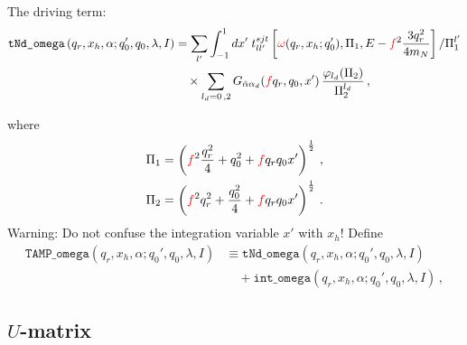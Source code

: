 \documentclass[11pt,aps]{revtex4}
\newcommand{\PF}{{\color{red}f}}
\newcommand{\orig}[1]{{\color{red} #1 }}
\newcommand{\cmplx}[1]{{\color{red} #1 }}
\begin{document}
The driving term:
\begin{equation}
\begin{split}
  \texttt{tNd\_omega}\left(q_r, x_h, \alpha; q_0', q_0, \lambda, I \right) &= \sum_{l'} \int_{-1}^1 dx'\; t_{ll'}^{sjt} \left[\cmplx{\omega}(q_r, x_h; q_0'), \Pi_1, E - \PF^2 \frac{3q_r^2}{4m_N}\right]/\Pi_1^{l'} \\
    & \quad \times \sum_{l_d = 0\, , 2} G_{\bar{\alpha} \alpha_d} (\PF q_r, q_0, x')\, \frac{\varphi_{l_d}(\Pi_2)}{\Pi_2^{l_d}}\, ,
\end{split}
\end{equation}



where
\begin{equation}
\begin{split}
  \Pi_1 &= \left(\PF^2 \frac{q_r^2}{4} + q_0^2 + \PF q_r q_0 x' \right)^{\frac{1}{2}} \, ,\\
  \Pi_2 &= \left(\PF^2 q_r^2 + \frac{q_0^2}{4} + \PF q_r q_0 x' \right)^{\frac{1}{2}} \, .
\end{split}
\end{equation}
Warning: Do not confuse the integration variable $x'$ with $x_h$!
Define
\begin{equation}
\begin{split}
\texttt{TAMP\_omega}\left(q_r, x_h, \alpha; q_0', q_0, \lambda, I\right) &\equiv \texttt{tNd\_omega}\left(q_r, x_h, \alpha; q_0', q_0, \lambda, I\right) \\
& \quad + \texttt{int\_omega}\left(q_r, x_h, \alpha; q_0', q_0, \lambda, I\right) \, ,
\end{split}
\end{equation}


\subsection{$U$-matrix}
\end{document}
